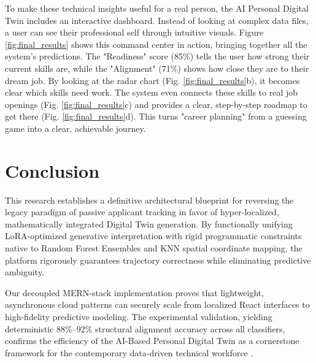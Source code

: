\documentclass[conference]{IEEEtran}
\begin{document}
To make these technical insights useful for a real person, the AI Personal Digital Twin includes an interactive dashboard. Instead of looking at complex data files, a user can see their professional self through intuitive visuals. Figure \ref{fig:final_results} shows this command center in action, bringing together all the system’s predictions. The "Readiness" score (85\%) tells the user how strong their current skills are, while the "Alignment" (71\%) shows how close they are to their dream job. By looking at the radar chart (Fig. \ref{fig:final_results}b), it becomes clear which skills need work. The system even connects these skills to real job openings (Fig. \ref{fig:final_results}c) and provides a clear, step-by-step roadmap to get there (Fig. \ref{fig:final_results}d). This turns "career planning" from a guessing game into a clear, achievable journey.

\FloatBarrier
\section{Conclusion}
This research establishes a definitive architectural blueprint for reversing the legacy paradigm of passive applicant tracking in favor of hyper-localized, mathematically integrated Digital Twin generation. By functionally unifying LoRA-optimized generative interpretation with rigid programmatic constraints native to Random Forest Ensembles and KNN spatial coordinate mapping, the platform rigorously guarantees trajectory correctness while eliminating predictive ambiguity. 

Our decoupled MERN-stack implementation proves that lightweight, asynchronous cloud patterns can securely scale from localized React interfaces to high-fidelity predictive modeling. The experimental validation, yielding deterministic 88\%--92\% structural alignment accuracy across all classifiers, confirms the efficiency of the AI-Based Personal Digital Twin as a cornerstone framework for the contemporary data-driven technical workforce \cite{b20}.
\end{document}

